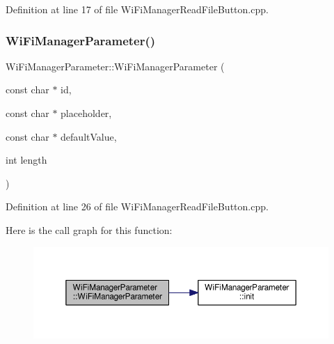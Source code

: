 Definition at line 17 of file Wi\+Fi\+Manager\+Read\+File\+Button.\+cpp.

\mbox{\label{class_wi_fi_manager_parameter_a8e55ac907530d04ab60d30045e1382a1}} 
\subsubsection{\texorpdfstring{Wi\+Fi\+Manager\+Parameter()}{WiFiManagerParameter()}\hspace{0.1cm}{\footnotesize\ttfamily [2/3]}}
{\footnotesize\ttfamily Wi\+Fi\+Manager\+Parameter\+::\+Wi\+Fi\+Manager\+Parameter (\begin{DoxyParamCaption}\item[{const char $\ast$}]{id,  }\item[{const char $\ast$}]{placeholder,  }\item[{const char $\ast$}]{default\+Value,  }\item[{int}]{length }\end{DoxyParamCaption})}



Definition at line 26 of file Wi\+Fi\+Manager\+Read\+File\+Button.\+cpp.

Here is the call graph for this function\+:\nopagebreak
\begin{figure}[H]
\begin{center}
\leavevmode
\includegraphics[width=350pt]{class_wi_fi_manager_parameter_a8e55ac907530d04ab60d30045e1382a1_cgraph}
\end{center}
\end{figure}
\mbox{\label{class_wi_fi_manager_parameter_a45967e1d29d52f5fc8e47e99cb693b98}} 
